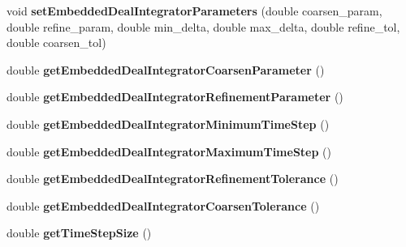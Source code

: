 \begin{DoxyCompactItemize}
\item 
\hypertarget{classnatrium_1_1SolverConfiguration_a7a017f7078ef42c350efbfca51d9681c}{
void {\bfseries setEmbeddedDealIntegratorParameters} (double coarsen\_\-param, double refine\_\-param, double min\_\-delta, double max\_\-delta, double refine\_\-tol, double coarsen\_\-tol)}
\label{classnatrium_1_1SolverConfiguration_a7a017f7078ef42c350efbfca51d9681c}

\item 
\hypertarget{classnatrium_1_1SolverConfiguration_a0e233c5ac8c6387bf31923700fd95b56}{
double {\bfseries getEmbeddedDealIntegratorCoarsenParameter} ()}
\label{classnatrium_1_1SolverConfiguration_a0e233c5ac8c6387bf31923700fd95b56}

\item 
\hypertarget{classnatrium_1_1SolverConfiguration_a9f8fda7b80e405dab21388cdb0eacbbe}{
double {\bfseries getEmbeddedDealIntegratorRefinementParameter} ()}
\label{classnatrium_1_1SolverConfiguration_a9f8fda7b80e405dab21388cdb0eacbbe}

\item 
\hypertarget{classnatrium_1_1SolverConfiguration_a42688d5882305d75929798685dcd3b0b}{
double {\bfseries getEmbeddedDealIntegratorMinimumTimeStep} ()}
\label{classnatrium_1_1SolverConfiguration_a42688d5882305d75929798685dcd3b0b}

\item 
\hypertarget{classnatrium_1_1SolverConfiguration_a01efc16a1f7c548ef83acdf4bb5bdaf4}{
double {\bfseries getEmbeddedDealIntegratorMaximumTimeStep} ()}
\label{classnatrium_1_1SolverConfiguration_a01efc16a1f7c548ef83acdf4bb5bdaf4}

\item 
\hypertarget{classnatrium_1_1SolverConfiguration_a2c6da5cc4bcfc653c0f3b93b57a4ddf5}{
double {\bfseries getEmbeddedDealIntegratorRefinementTolerance} ()}
\label{classnatrium_1_1SolverConfiguration_a2c6da5cc4bcfc653c0f3b93b57a4ddf5}

\item 
\hypertarget{classnatrium_1_1SolverConfiguration_afedfb3328b78940a7e929214c6d08741}{
double {\bfseries getEmbeddedDealIntegratorCoarsenTolerance} ()}
\label{classnatrium_1_1SolverConfiguration_afedfb3328b78940a7e929214c6d08741}

\item 
\hypertarget{classnatrium_1_1SolverConfiguration_ae446f5d60a09f30a43258a5ec2bebbbf}{
double {\bfseries getTimeStepSize} ()}
\label{classnatrium_1_1SolverConfiguration_ae446f5d60a09f30a43258a5ec2bebbbf}


\end{DoxyCompactItemize}
